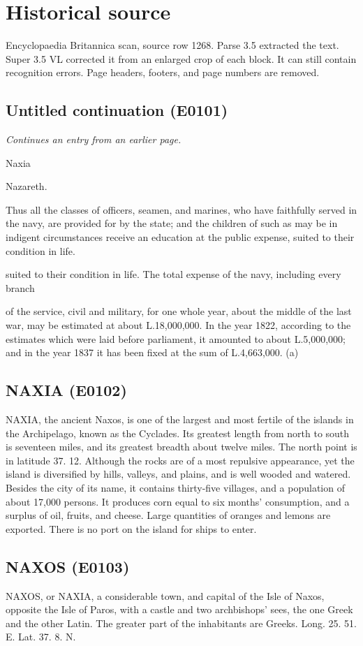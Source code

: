 \documentclass{article}
\begin{document}
\section*{Historical source}
Encyclopaedia Britannica scan, source row 1268. Parse 3.5 extracted the text. Super 3.5 VL corrected it from an enlarged crop of each block. It can still contain recognition errors.
Page headers, footers, and page numbers are removed.

\subsection*{Untitled continuation (E0101)}
\textit{Continues an entry from an earlier page.}

Naxia

Nazareth.

Thus all the classes of officers, seamen, and marines, who have faithfully served in the navy, are provided for by the state; and the children of such as may be in indigent circumstances receive an education at the public expense, suited to their condition in life.

suited to their condition in life.
The total expense of the navy, including every branch

of the service, civil and military, for one whole year, about the middle of the last war, may be estimated at about L.18,000,000. In the year 1822, according to the estimates which were laid before parliament, it amounted to about L.5,000,000; and in the year 1837 it has been fixed at the sum of L.4,663,000. (a)

\subsection*{NAXIA (E0102)}
NAXIA, the ancient Naxos, is one of the largest and most fertile of the islands in the Archipelago, known as the Cyclades. Its greatest length from north to south is seventeen miles, and its greatest breadth about twelve miles. The north point is in latitude 37. 12. Although the rocks are of a most repulsive appearance, yet the island is diversified by hills, valleys, and plains, and is well wooded and watered. Besides the city of its name, it contains thirty-five villages, and a population of about 17,000 persons. It produces corn equal to six months' consumption, and a surplus of oil, fruits, and cheese. Large quantities of oranges and lemons are exported. There is no port on the island for ships to enter.

\subsection*{NAXOS (E0103)}
NAXOS, or NAXIA, a considerable town, and capital of the Isle of Naxos, opposite the Isle of Paros, with a castle and two archbishops' sees, the one Greek and the other Latin. The greater part of the inhabitants are Greeks. Long. 25. 51. E. Lat. 37. 8. N.
\end{document}
